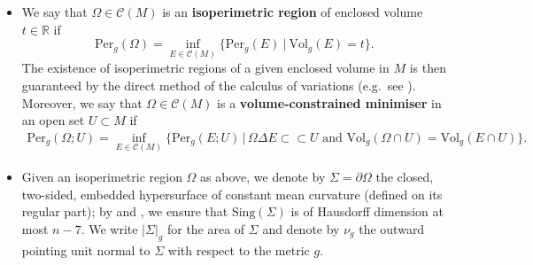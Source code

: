 \documentclass[12pt]{article}
\begin{document}
\begin{itemize}
    \item We say that $\Omega \in \mathcal{C}(M)$ is an \textbf{isoperimetric region} of enclosed volume $t \in \mathbb{R}$ if
    \begin{equation*}
        \mathrm{Per}_g(\Omega ) = \inf_{E \in \mathcal{C}(M)}\{\mathrm{Per}_g(E) \: | \: \mathrm{Vol}_g(E) = t\}.
    \end{equation*}
    The existence of isoperimetric regions of a given enclosed volume in $M$ is then guaranteed by the direct method of the calculus of variations (e.g.~see \cite[Section 13.2]{M16}). Moreover, we say that $\Omega \in \mathcal{C}(M)$ is a \textbf{volume-constrained minimiser} in an open set $U \subset M$ if 
    \begin{align*}
        \mathrm{Per}_g(\Omega; U ) = \inf_{E\in \mathcal{C}(M)} \{\mathrm{Per}_g(E; U) \, | \, \Omega \Delta E \subset \subset U \text{ and  } \mathrm{Vol}_g(\Omega\cap U) = \mathrm{Vol}_g(E\cap U) \}.
    \end{align*}
    
    \item Given an isoperimetric region $\Omega$ as above, we denote by $\Sigma =\partial \Omega$ the closed, two-sided, embedded hypersurface of constant mean curvature (defined on its regular part); by \cite{GMT83} and \cite{M03}, we ensure that $\mathrm{Sing}(\Sigma)$ is of Hausdorff dimension at most $n-7$. We write $|\Sigma|_g$ for the area of $\Sigma$ and denote by $\nu_g$ the outward pointing unit normal to $\Sigma$ with respect to the metric $g$.


\end{itemize}
\end{document}
